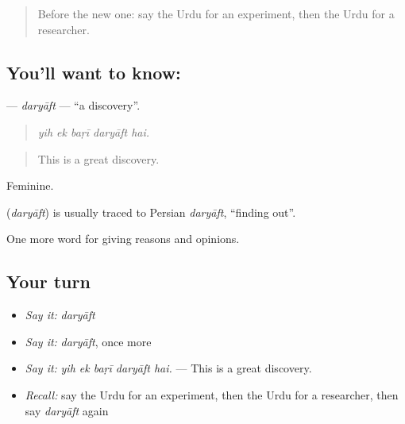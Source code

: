 \label{lesson:UR-C349-daryaft}



\begin{quote}
Before the new one: say the Urdu for an experiment, then the Urdu for a researcher.
\end{quote}

\subsection*{You'll want to know: }
\textbf{} — \emph{daryāft} — \textquotedblleft{}a discovery\textquotedblright{}.

\begin{quote}
    
\end{quote}

\begin{quote}
\emph{yih ek baṛī daryāft hai.}
\end{quote}

\begin{quote}
This is a great discovery.
\end{quote}

Feminine.

\begin{cousinweb}
\textbf{} (\emph{daryāft}) is usually traced to Persian \emph{daryāft}, \textquotedblleft{}finding out\textquotedblright{}.
\end{cousinweb}

\begin{grammarlens}[title={What you've built}]
One more word for giving reasons and opinions.
\end{grammarlens}

\subsection*{Your turn}
\begin{itemize}
\raggedright
  \item \emph{Say it:} \emph{daryāft}
  \item \emph{Say it:} \emph{daryāft}, once more
  \item \emph{Say it:} \emph{yih ek baṛī daryāft hai.} — This is a great discovery.
  \item \emph{Recall:} say the Urdu for an experiment, then the Urdu for a researcher, then say \emph{daryāft} again
\end{itemize}


